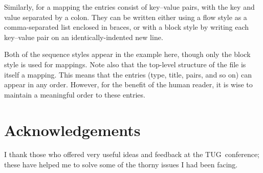 \documentclass{article}
\def\TUG{{\small TUG}}
\begin{document}
Similarly, for a mapping the entries consist of key--value pairs, with
the key and value separated by a colon.  They can be written either
using a flow style as a comma-separated list enclosed in braces, or
with a block style by writing each key--value pair on an
identically-indented new line.

Both of the sequence styles appear in the example here, though only
the block style is used for mappings.  Note also that the top-level
structure of the file is itself a mapping.  This means that the
entries (type, title, pairs, and so on) can appear in any order.
However, for the benefit of the human reader, it is wise to maintain a
meaningful order to these entries.

\section*{Acknowledgements}

I thank those who offered very useful ideas and feedback at the \TUG\
conference; these have helped me to solve some of the thorny issues I
had been facing.

\smallskip


\end{document}
